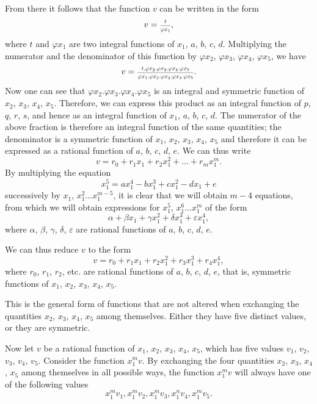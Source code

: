 \documentclass[oneside, 12 pt, leqno]{memoir}
\let\oldfrac\frac
\def\frac#1#2{\mathchoice{\text{\scalebox{.83}{${\oldfrac{#1}{#2}}$}}}{\text{\scalebox{.83}{${\displaystyle\oldfrac{#1}{#2}}$}}}{\genfrac{}{}{}{2}{#1}{#2}}{\genfrac{}{}{}{3}{#1}{#2}}}
\begin{document}
From there it follows that the function \(v\) can be written in the form
\[v=\frac{t}{\varphi x_1},\]
where \(t\) and \(\varphi x_1\) are two integral functions of \(x_1\), \(a\), \(b\), \(c\), \(d\). Multiplying the numerator and the denominator of this function by \(\varphi x_2\), \(\varphi x_3\), \(\varphi x_4\), \(\varphi x_5\), we have
\[ v = \frac{t . \varphi x_2 . \varphi x_3 . \varphi x_4 . \varphi x_5}{\varphi x_1 . \varphi x_2 . \varphi x_3 . \varphi x_4 . \varphi x_5}.\]
Now one can see that \(\varphi x_2 . \varphi x_3 . \varphi x_4 . \varphi x_5\) is an integral and symmetric function of \(x_2\), \(x_3\), \(x_4\), \(x_5\). Therefore, we can express this product as an integral function of \(p\), \(q\), \(r\), \(s\), and hence as an integral function of \(x_1\), \(a\), \(b\), \(c\), \(d\). The numerator of the above fraction is therefore an integral function of the same quantities; the denominator is a symmetric function of \(x_1\), \(x_2\), \(x_3\), \(x_4\), \(x_5\) and therefore it can be expressed as a rational function of \(a\), \(b\), \(c\), \(d\), \(e\). We can thus write
\[v=r_0+r_1 x_1+r_2 x_1^2+\dots+r_m x_1^m.\]
By multiplying the equation
\[x_1^5=a x_1^4-b x_1^3+c x_1^2-d x_1+e\]
successively by \(x_1\), \(x_1^2 \dots x_1^{m-5}\), it is clear that we will obtain \(m-4\) equations, from which we will obtain expressions for \(x_1^5\), \(x_1^6 \dots x_1^m\) of the form
\[\alpha+\beta x_1+\gamma x_1^2+ \delta x_1^3+ \varepsilon x_1^4,\]
where \(\alpha\), \(\beta\), \(\gamma\), \(\delta\), \(\varepsilon\) are rational functions of \(a\), \(b\), \(c\), \(d\), \(e\).

We can thus reduce \(v\) to the form
\[\tag{a}v=r_0+r_1 x_1+r_2 x_1^2+r_3 x_1^3+r_4 x_1^4,\]
where \(r_0\), \(r_1\), \(r_2\), etc. are rational functions of \(a\), \(b\), \(c\), \(d\), \(e\), that is, symmetric functions of \(x_1\), \(x_2\), \(x_3\), \(x_4\), \(x_5\).

This is the general form of functions that are not altered when exchanging the quantities \(x_2\), \(x_3\), \(x_4\), \(x_5\) among themselves. Either they have five distinct values, or they are symmetric.

Now let \(v\) be a rational function of \(x_1\), \(x_2\), \(x_3\), \(x_4\), \(x_5\), which has five values \(v_1\), \(v_2\), \(v_3\), \(v_4\), \(v_5\).  Consider the function \(x_1^m v\). By exchanging the four quantities \(x_2\), \(x_3\), \(x_4\), \(x_5\) among themselves in all possible ways, the function \(x_1^m v\) will always have one of the following values
\[x_1^m v_1, x_1^m v_2, x_1^m v_3, x_1^n v_4, x_1^m v_5.\]
\end{document}
